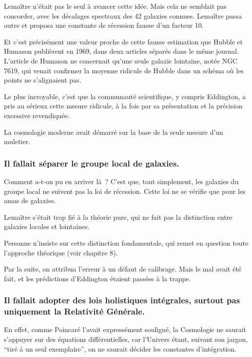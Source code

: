 \documentclass[a4paper,12pt]{article}
\begin{document}
Lemaître n’était pas le seul à avancer cette idée. Mais cela ne semblait pas concorder, avec les  décalages spectraux des 42 galaxies connues. Lema\^itre passa outre et proposa une constante de récession fausse d’un facteur 10.


Et c’est précisément une valeur proche de cette fausse estimation que Hubble et Humason publièrent en 1969, dans deux articles séparés dans le m\^eme journal. L’article de Humason ne concernait qu’une seule galaxie lointaine, notée NGC 7619, qui venait confirmer la moyenne ridicule de Hubble dans un schéma où les points ne s’alignaient pas. 


Le plus incroyable, c’est que la communauté scientifique, y compris Eddington, a pris au sérieux cette mesure ridicule, à la fois par sa présentation et la précision excessive revendiquée.


La cosmologie moderne avait démarré sur la base de la seule mesure d’un muletier.


\subsubsection{Il fallait séparer le groupe local de galaxies.} 

Comment a-t-on pu en arriver là ? C’est que, tout simplement, les galaxies du groupe local ne suivent pas la loi de récession. Cette loi ne se vérifie que pour les amas de galaxies. 


Lemaître s’était trop fié à la théorie pure, qui ne fait pas la distinction entre galaxies locales et lointaines.

Personne n’insiste sur cette distinction fondamentale, qui remet en question toute l’approche théorique (voir chapitre 8). 


Par la suite, on attribua l’erreur à un défaut de calibrage. Mais le mal avait été fait, et les prédictions d’Eddington étaient passées à la trappe.



\subsubsection{Il fallait adopter des lois holistiques intégrales, surtout pas uniquement la Relativité Générale.}
 
En effet, comme Poincaré l'avait expressément souligné, la Cosmologie ne saurait s'appuyer sur des équations différentielles, car l'Univers étant, suivant son jargon, ``tiré à un seul exemplaire'', on ne saurait décider les constantes d'intégration. 
\end{document}
